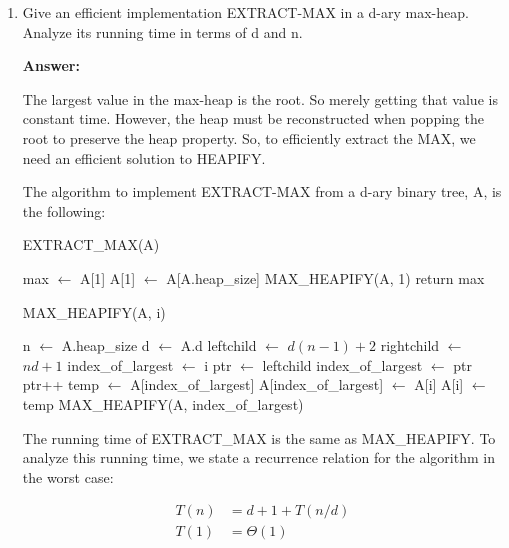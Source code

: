 \documentclass[]{book}
\theoremstyle{definition}
\begin{document}
\begin{enumerate}
    \item Give an efficient implementation EXTRACT-MAX in a d-ary max-heap. Analyze its running time in terms of d and n.

    \textbf{Answer:} 
    
    The largest value in the max-heap is the root. So merely getting that value is constant time. However,
    the heap must be reconstructed when popping the root to preserve the heap property. So, to efficiently
    extract the MAX, we need an efficient solution to HEAPIFY.

    The algorithm to implement EXTRACT-MAX from a d-ary binary tree, A, is the following:

    \begin{algorithm}[h]
    \caption{EXTRACT\_MAX(A)}
    \begin{algorithmic}[1]
    \STATE max $\leftarrow$ A[1]
    \STATE A[1] $\leftarrow$ A[A.heap\_size]
    \STATE MAX\_HEAPIFY(A, 1)
    \STATE return max
    \end{algorithmic}
    \end{algorithm}

    \begin{algorithm}[h]
    \caption{MAX\_HEAPIFY(A, i)}
    \begin{algorithmic}[1]
    \STATE n $\leftarrow$ A.heap\_size
    \STATE d $\leftarrow$ A.d
    \STATE leftchild $\leftarrow$ $d(n-1) + 2$
    \STATE rightchild $\leftarrow$ $nd + 1$
    \STATE index\_of\_largest $\leftarrow$ i
    \STATE ptr $\leftarrow$ leftchild
            \STATE index\_of\_largest $\leftarrow$ ptr
        \ENDIF
        \STATE ptr++
    \ENDWHILE
        \STATE temp $\leftarrow$ A[index\_of\_largest]
        \STATE A[index\_of\_largest] $\leftarrow$ A[i]
        \STATE A[i] $\leftarrow$ temp
        \STATE MAX\_HEAPIFY(A, index\_of\_largest)
    \ENDIF
    \end{algorithmic}
    \end{algorithm}

    The running time of EXTRACT\_MAX is the same as MAX\_HEAPIFY.
    To analyze this running time, we state a recurrence relation for the algorithm in the worst case:

    \begin{align*}
        T(n) &= d + 1 + T(n/d) \\
        T(1) &= \Theta(1)
    \end{align*}


\end{enumerate}
\end{document}
